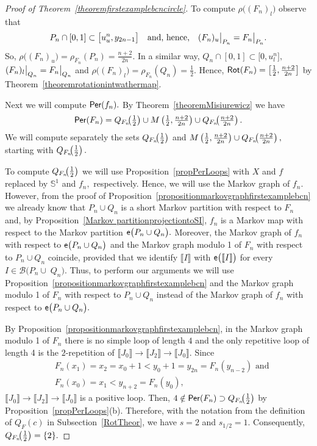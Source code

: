 \documentclass[a4paper, 11pt]{amsart}
\numberwithin{equation}{section}
\theoremstyle{customnumberedtheorem}
\theoremstyle{definitionwithbfnote}
\newcommand{\SI}{\ensuremath{\mathbb{S}^1}}
\DeclareMathOperator{\Per}{\textsf{\upshape Per}}
\DeclareMathOperator{\Rot}{\textsf{\upshape Rot}}
\DeclareMathOperator{\eexp}{\textsf{\upshape e}}
\newcommand{\BIclass}[1]{\ensuremath{\llbracket #1\rrbracket}}
\newcommand{\bigemap}[1]{\ensuremath{\eexp\bigl(#1\bigr)}}
\def\calB{\mathcal{B}}
\newcommand{\bigSBI}[1]{\ensuremath{\calB\bigl(#1\bigr)}}
\newcommand{\andq}[1][and]{\ensuremath{\quad\text{#1}\quad}}
\newcommand{\evalat}[1]{\bigr\rvert\sb{#1}}
\begin{document}
\begin{proof}[Proof of Theorem~\ref{theoremfirstexamplebcncircle}]
To compute $\rho\bigl((F_n)_l\bigr)$ observe that
\[ P_n \cap [0,1] \subset \bigl[u^n_u,y_{2n-1}\bigr] \andq[and, hence,]
   (F_n)_u\evalat{P_n} = F_n\evalat{P_n}.
\]
So,
$\rho\bigl((F_n)_u\bigr) = \rho_{F_n}(P_n) = \tfrac{n+2}{2n}.$
In a similar way,
$Q_n \cap [0,1] \subset \bigl[0, u^n_l\bigr],$
$(F_n)_l\evalat{Q_n} = F_n\evalat{Q_n}$ and
$\rho\bigl((F_n)_l\bigr) = \rho_{F_n}(Q_n) = \tfrac{1}{2}.$
Hence, $\Rot(F_n) = \left[\tfrac{1}{2}, \tfrac{n+2}{2n}\right]$
by Theorem~\ref{theoremrotationintwathermap}.

Next we will compute $\Per(f_n).$
By Theorem~\ref{theoremMisiurewicz} we have
\[
\Per(F_n) = Q_{F_n}\mspace{-8.0mu}\left(\tfrac{1}{2}\right) \cup
            M\left(\tfrac{1}{2}, \tfrac{n+2}{2n}\right) \cup
            Q_{F_n}\mspace{-8.0mu}\left(\tfrac{n+2}{2n}\right).
\]
We will compute separately the sets
$Q_{F_n}\mspace{-8.0mu}\left(\tfrac{1}{2}\right)$ and
$
  M\left(\tfrac{1}{2}, \tfrac{n+2}{2n}\right) \cup
  Q_{F_n}\mspace{-8.0mu}\left(\tfrac{n+2}{2n}\right),
$
starting with $Q_{F_n}\mspace{-8.0mu}\left(\tfrac{1}{2}\right).$

To compute $Q_{F_n}\mspace{-8.0mu}\left(\tfrac{1}{2}\right)$
we will use Proposition~\ref{propPerLoops} with $X$ and $f$
replaced by $\SI$ and $f_n,$ respectively.
Hence, we will use the Markov graph of $f_n.$
However, from the proof of
Proposition~\ref{propositionmarkovgraphfirstexamplebcn}
we already know that $P_n \cup Q_n$ is a short Markov partition with
respect to $F_n$ and,
by Proposition~\ref{Markov partitionprojectiontoSI},
$f_n$ is a Markov map with respect to the Markov
partition $\bigemap{P_n \cup Q_n}.$
Moreover,
the Markov graph of $f_n$ with respect to
$\bigemap{P_n \cup Q_n}$
and the Markov graph modulo 1 of $F_n$ with respect to
$P_n \cup Q_n$ coincide, provided that we identify
$\BIclass{I}$ with $\bigemap{\BIclass{I}}$ for every
$I \in \bigSBI{P_n \cup\; Q_n}$.
Thus, to perform our arguments we will use
Proposition~\ref{propositionmarkovgraphfirstexamplebcn} and
the Markov graph modulo 1 of $F_n$ with respect to
$P_n \cup Q_n$
instead of the Markov graph of $f_n$ with respect to
$\bigemap{P_n \cup Q_n}.$

By Proposition~\ref{propositionmarkovgraphfirstexamplebcn},
in the Markov graph modulo 1 of $F_n$
there is no simple loop of length $4$
and the only repetitive loop of length 4 is the $2$-repetition
of
$
\BIclass{J_0} \longrightarrow \BIclass{J_2} \longrightarrow \BIclass{J_0}.
$
Since
\begin{align*}
& F_n(x_1) = x_2 = x_0 + 1 < y_{0} + 1 = y_{2n} = F_n(y_{n-2})\text{ and}\\
& F_n(x_0) = x_1 < y_{n+2} = F_n(y_0),
\end{align*}
$
\BIclass{J_0} \longrightarrow \BIclass{J_2} \longrightarrow \BIclass{J_0}
$
is a positive loop. Then,
$4 \notin \Per(F_n) \supset Q_{F_n}\mspace{-8.0mu}\left(\tfrac{1}{2}\right)$
by Proposition~\ref{propPerLoops}(b).
Therefore, with the notation from the definition of $Q_F(c)$
in Subsection~\ref{RotTheor}, we have $s=2$ and $s_{1/2} = 1.$
Consequently,
$Q_{F_n}\mspace{-8.0mu}\left(\tfrac{1}{2}\right) = \{2\}.$


\end{proof}
\end{document}
